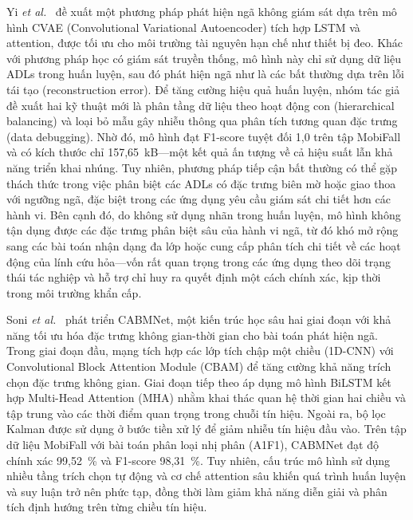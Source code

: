 Yi \textit{et al.}~\cite{yi2024fall} đề xuất một phương pháp phát hiện ngã không giám sát dựa trên mô hình CVAE (Convolutional Variational Autoencoder) tích hợp LSTM và attention, được tối ưu cho môi trường tài nguyên hạn chế như thiết bị đeo. Khác với phương pháp học có giám sát truyền thống, mô hình này chỉ sử dụng dữ liệu ADLs trong huấn luyện, sau đó phát hiện ngã như là các bất thường dựa trên lỗi tái tạo (reconstruction error). Để tăng cường hiệu quả huấn luyện, nhóm tác giả đề xuất hai kỹ thuật mới là phân tầng dữ liệu theo hoạt động con (hierarchical balancing) và loại bỏ mẫu gây nhiễu thông qua phân tích tương quan đặc trưng (data debugging). Nhờ đó, mô hình đạt F1-score tuyệt đối 1,0 trên tập MobiFall và có kích thước chỉ 157,65~kB—một kết quả ấn tượng về cả hiệu suất lẫn khả năng triển khai nhúng. Tuy nhiên, phương pháp tiếp cận bất thường có thể gặp thách thức trong việc phân biệt các ADLs có đặc trưng biên mờ hoặc giao thoa với ngưỡng ngã, đặc biệt trong các ứng dụng yêu cầu giám sát chi tiết hơn các hành vi. Bên cạnh đó, do không sử dụng nhãn trong huấn luyện, mô hình không tận dụng được các đặc trưng phân biệt sâu của hành vi ngã, từ đó khó mở rộng sang các bài toán nhận dạng đa lớp hoặc cung cấp phân tích chi tiết về các hoạt động của lính cứu hỏa—vốn rất quan trọng trong các ứng dụng theo dõi trạng thái tác nghiệp và hỗ trợ chỉ huy ra quyết định một cách chính xác, kịp thời trong môi trường khẩn cấp.

Soni \textit{et al.}~\cite{soni2024cabmnet} phát triển CABMNet, một kiến trúc học sâu hai giai đoạn với khả năng tối ưu hóa đặc trưng không gian-thời gian cho bài toán phát hiện ngã. Trong giai đoạn đầu, mạng tích hợp các lớp tích chập một chiều (1D-CNN) với Convolutional Block Attention Module (CBAM) để tăng cường khả năng trích chọn đặc trưng không gian. Giai đoạn tiếp theo áp dụng mô hình BiLSTM kết hợp Multi-Head Attention (MHA) nhằm khai thác quan hệ thời gian hai chiều và tập trung vào các thời điểm quan trọng trong chuỗi tín hiệu. Ngoài ra, bộ lọc Kalman được sử dụng ở bước tiền xử lý để giảm nhiễu tín hiệu đầu vào. Trên tập dữ liệu MobiFall với bài toán phân loại nhị phân (A1F1), CABMNet đạt độ chính xác 99,52~\% và F1-score 98,31~\%. Tuy nhiên, cấu trúc mô hình sử dụng nhiều tầng trích chọn tự động và cơ chế attention sâu khiến quá trình huấn luyện và suy luận trở nên phức tạp, đồng thời làm giảm khả năng diễn giải và phân tích định hướng trên từng chiều tín hiệu.


